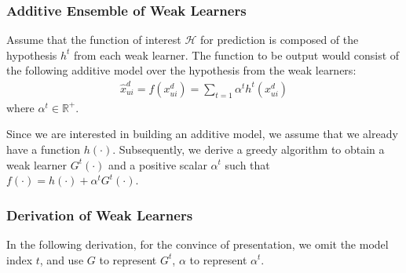 \hspace{0.03in}
\subsubsection{Additive Ensemble of Weak Learners}

Assume that the function of interest $\mathcal{H}$ for prediction is composed of the hypothesis $h^t$ from each weak learner. The function to be output would consist of the following additive model over the hypothesis from the weak learners:
\begin{eqnarray}
    \hat x^d_{ui} = f(x^d_{ui}) = \sum_{t=1} \alpha^t h^t(x^d_{ui})
\end{eqnarray}
where $\alpha^t \in \mathbb{R}^+$.

Since we are interested in building an additive model, we assume that we already have a function $h(\cdot)$. Subsequently, we derive a greedy algorithm to obtain a weak learner $G^t(\cdot)$ and a positive scalar $\alpha^t$ such that $f(\cdot) = h(\cdot) + \alpha^t G^t(\cdot)$.

\hspace{0.03in}
\subsubsection{Derivation of Weak Learners}
In the following derivation, for the convince of presentation, we omit the model index $t$, and use $G$ to represent $G^t$, $\alpha$ to represent $\alpha^t$.


